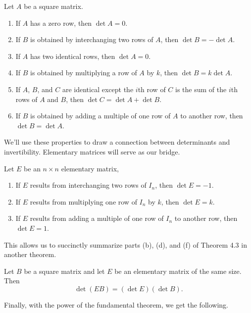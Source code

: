 \documentclass[../m73main.tex]{chapters}
\begin{document}
\begin{theorem}
	Let $A$ be a square matrix.
	\begin{enumerate}[label=(\alph*)]
		\item If $A$ has a zero row, then $\det A = 0$.
		\item If $B$ is obtained by interchanging two rows of $A$, then $\det B = -\det A$.
		\item If $A$ has two identical rows, then $\det A = 0$.
		\item If $B$ is obtained by multiplying a row of $A$ by $k$, then $\det B = k \det A$.
		\item If $A$, $B$, and $C$ are identical except the $i$th row of $C$ is the sum of the $i$th rows of $A$ and $B$, then $\det C = \det A + \det B$.
		\item If $B$ is obtained by adding a multiple of one row of $A$ to another row, then $\det B = \det A$.
	\end{enumerate}
\end{theorem}

We'll use these properties to draw a connection between determinants and invertibility.
Elementary matrices will serve as our bridge.

\begin{theorem}
	Let $E$ be an $n \times n$ elementary matrix,
	\begin{enumerate}[label=(\alph*)]
		\item If $E$ results from interchanging two rows of $I_n$, then $\det E = -1$.
		\item If $E$ results from multiplying one row of $I_n$ by $k$, then $\det E = k$.
		\item If $E$ results from adding a multiple of one row of $I_n$ to another row, then $\det E = 1$.
	\end{enumerate}
\end{theorem}

This allows us to succinctly summarize parts (b), (d), and (f) of Theorem 4.3 in another theorem.

\begin{lemma}
	Let $B$ be a square matrix and let $E$ be an elementary matrix of the same size.
	Then
	\[ \det (EB) = (\det E)(\det B). \]
\end{lemma}

Finally, with the power of the fundamental theorem, we get the following.
\end{document}
